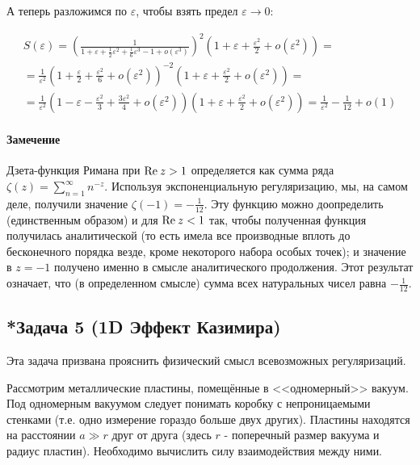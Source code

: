 \documentclass[a4paper,12pt]{article}
\begin{document}
\noindent
А теперь разложимся по $\varepsilon$, чтобы взять предел $\varepsilon\to0$:

\begin{multline*}
S\left(\varepsilon\right)=\left(\frac{1}{1+\varepsilon+\frac{1}{2}\varepsilon^{2}+\frac{1}{6}\varepsilon^{3}-1+o(\varepsilon^{3})}\right)^{2}\left(1+\varepsilon+\frac{\varepsilon^{2}}{2}+o(\varepsilon^{2})\right)=\\
=\frac{1}{\varepsilon^{2}}\left(1+\frac{\varepsilon}{2}+\frac{\varepsilon^{2}}{6}+o(\varepsilon^{2})\right)^{-2}\left(1+\varepsilon+\frac{\varepsilon^{2}}{2}+o(\varepsilon^{2})\right)=\\
=\frac{1}{\varepsilon^{2}}\left(1-\varepsilon-\frac{\varepsilon^{2}}{3}+\frac{3\varepsilon^{2}}{4}+o(\varepsilon^{2})\right)\left(1+\varepsilon+\frac{\varepsilon^{2}}{2}+o(\varepsilon^{2})\right)=\frac{1}{\varepsilon^{2}}-\frac{1}{12}+o(1)
\end{multline*}



\paragraph{Замечение}

Дзета-функция Римана при ${\rm Re}\:z>1$ определяется как сумма ряда
$\zeta(z)=\sum_{n=1}^{\infty}n^{-z}$. Используя экспоненциальную
регуляризацию, мы, на самом деле, получили значение $\zeta(-1)=-\frac{1}{12}$.
Эту функцию можно доопределить (единственным образом) и для ${\rm Re}\:z<1$
так, чтобы полученная функция получилась аналитической (то есть имела
все производные вплоть до бесконечного порядка везде, кроме некоторого
набора особых точек); и значение в $z=-1$ получено именно в смысле
аналитического продолжения. Этот результат означает, что (в определенном
смысле) сумма всех натуральных чисел равна $-\frac{1}{12}$.

\subsection*{*Задача 5 (1D Эффект Казимира)}

Эта задача призвана прояснить физический смысл всевозможных регуляризаций. 

\noindent
Рассмотрим металлические пластины, помещённые в <<одномерный>> вакуум. Под одномерным вакуумом следует понимать коробку с непроницаемыми стенками (т.е. одно измерение гораздо больше двух других). Пластины находятся на расстоянии $a\gg r$ друг от друга (здесь $r$ - поперечный размер вакуума и радиус пластин). Необходимо вычислить силу взаимодействия между ними.
\end{document}
